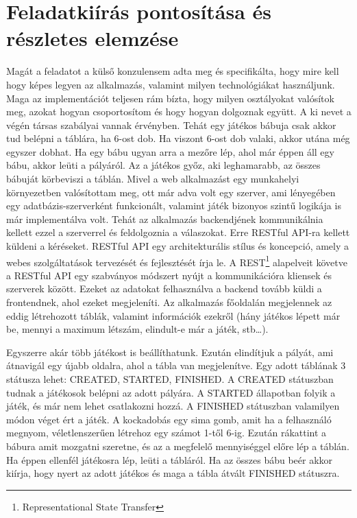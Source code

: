 \documentclass[a4paper,twoside]{article}
\begin{document}
\section{Feladatkiírás pontosítása és részletes elemzése}
Magát a feladatot a külső konzulensem adta meg és specifikálta, hogy mire kell hogy képes
legyen az alkalmazás, valamint milyen technológiákat használjunk. Maga az implementációt
teljesen rám bízta, hogy milyen osztályokat valósítok meg, azokat hogyan csoportosítom és
hogy hogyan dolgoznak együtt.
A ki nevet a végén társas szabályai vannak érvényben. Tehát egy játékos bábuja csak akkor
tud belépni a táblára, ha 6-ost dob. Ha viszont 6-ost dob valaki, akkor utána még egyszer
dobhat. Ha egy bábu ugyan arra a mezőre lép, ahol már éppen áll egy bábu, akkor leüti a
pályáról. Az a játékos győz, aki leghamarabb, az összes bábuját körbeviszi a táblán.
Mivel a web alkalmazást egy munkahelyi környezetben valósítottam meg, ott már adva volt
egy szerver, ami lényegében egy adatbázis-szerverként funkcionált, valamint játék bizonyos
szintű logikája is már implementálva volt. Tehát az alkalmazás backendjének kommunikálnia
kellett ezzel a szerverrel és feldolgoznia a válaszokat. Erre RESTful API-ra kellett küldeni a
kéréseket. RESTful API egy architekturális stílus és koncepció, amely a webes szolgáltatások
tervezését és fejlesztését írja le. A REST\footnote{Representational State Transfer} alapelveit követve
a RESTful API egy szabványos módszert nyújt a kommunikációra kliensek és szerverek
között. Ezeket az adatokat felhasználva a backend tovább küldi a frontendnek, ahol ezeket
megjeleníti.
Az alkalmazás főoldalán megjelennek az eddig létrehozott táblák, valamint információk
ezekről (hány játékos lépett már be, mennyi a maximum létszám, elindult-e már a játék,
stb\ldots). 

Egyszerre akár több játékost is beállíthatunk. Ezután elindítjuk a pályát, ami átnavigál egy
újabb oldalra, ahol a tábla van megjelenítve. Egy adott táblának 3 státusza lehet: CREATED,
STARTED, FINISHED. A CREATED státuszban tudnak a játékosok belépni az adott pályára. A STARTED állapotban folyik a játék, és már nem lehet csatlakozni hozzá. A FINISHED státuszban valamilyen módon véget ért a játék. A kockadobás egy sima gomb, amit ha a
felhasználó megnyom, véletlenszerűen létrehoz egy számot 1-től 6-ig. Ezután rákattint a bábura amit mozgatni
szeretne, és az a megfelelő mennyiséggel előre lép a táblán. Ha éppen ellenfél játékosra lép,
leüti a tábláról. Ha az összes bábu beér akkor kiírja, hogy nyert az adott játékos és maga a
tábla átvált FINISHED státuszra.
\end{document}
